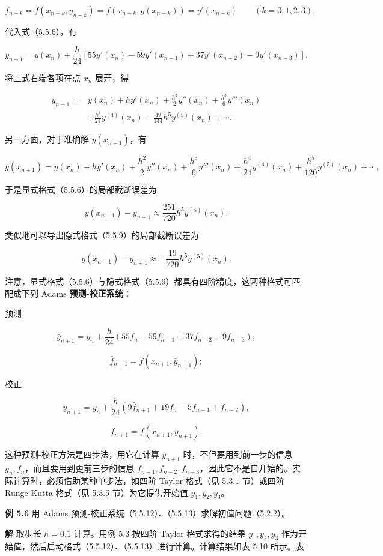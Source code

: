 \documentclass[
  10pt,
  fontset=fandol]{ctexart}
\begin{document}
\[
f_{n-k}=f(x_{n-k},y_{n-k})=f(x_{n-k},y(x_{n-k}))=y'(x_{n-k})\qquad(k=0,1,2,3),
\]

代入式（5.5.6），有

\[
y_{n+1}=y(x_n)+\frac h{24}[55y'(x_n)-59y'(x_{n-1})+37y'(x_{n-2})-9y'(x_{n-3})].
\]

将上式右端各项在点 \(x_n\) 展开，得

\[
\begin{aligned}
y_{n+1}={}&y(x_n)+hy'(x_n)+\frac{h^2}{2}y''(x_n)+\frac{h^3}{6}y'''(x_n)\\
&+\frac{h^4}{24}y^{(4)}(x_n)-\frac{49}{144}h^5y^{(5)}(x_n)+\cdots.
\end{aligned}
\]

另一方面，对于准确解 \(y(x_{n+1})\)，有

\[
y(x_{n+1})=y(x_n)+hy'(x_n)+\frac{h^2}{2}y''(x_n)+\frac{h^3}{6}y'''(x_n)+\frac{h^4}{24}y^{(4)}(x_n)+\frac{h^5}{120}y^{(5)}(x_n)+\cdots,
\]

于是显式格式（5.5.6）的局部截断误差为

\[
y(x_{n+1})-y_{n+1}\approx\frac{251}{720}h^5y^{(5)}(x_n).
\tag{5.5.10}
\]

类似地可以导出隐式格式（5.5.9）的局部截断误差为

\[
y(x_{n+1})-y_{n+1}\approx-\frac{19}{720}h^5y^{(5)}(x_n).
\tag{5.5.11}
\]

注意，显式格式（5.5.6）与隐式格式（5.5.9）都具有四阶精度，这两种格式可匹配成下列 Adams \textbf{预测-校正系统}：

预测

\[
\bar y_{n+1}=y_n+\frac h{24}(55f_n-59f_{n-1}+37f_{n-2}-9f_{n-3}),
\tag{5.5.12}
\]

\[
\bar f_{n+1}=f(x_{n+1},\bar y_{n+1});
\]

校正

\[
y_{n+1}=y_n+\frac h{24}(9\bar f_{n+1}+19f_n-5f_{n-1}+f_{n-2}),
\tag{5.5.13}
\]

\[
f_{n+1}=f(x_{n+1},y_{n+1}).
\]

这种预测-校正方法是四步法，用它在计算 \(y_{n+1}\) 时，不但要用到前一步的信息 \(y_n,f_n\)，而且要用到更前三步的信息 \(f_{n-1},f_{n-2},f_{n-3}\)，因此它不是自开始的。实际计算时，必须借助某种单步法，如四阶 Taylor 格式（见 5.3.1 节）或四阶 Runge-Kutta 格式（见 5.3.5 节）为它提供开始值 \(y_1,y_2,y_3\)。

\textbf{例 5.6} 用 Adams 预测-校正系统（5.5.12）、（5.5.13）求解初值问题（5.2.2）。

\textbf{解} 取步长 \(h=0.1\) 计算。用例 5.3 按四阶 Taylor 格式求得的结果 \(y_1,y_2,y_3\) 作为开始值，然后启动格式（5.5.12）、（5.5.13）进行计算。计算结果如表 5.10 所示。表
\end{document}
